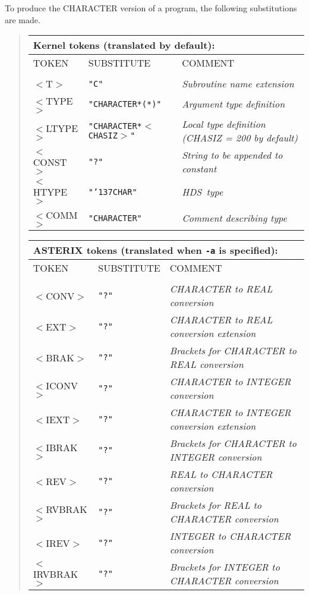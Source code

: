 \documentclass[twoside,11pt]{article}
\renewcommand{\_}{{\tt\char'137}}     %
\newcommand{\HDS}{{\footnotesize HDS}\normalsize}
\begin{document}
To produce the CHARACTER version of a program, the following
substitutions are made.
\begin{quote}
\begin{tabular}{lll}
\multicolumn{3}{l}{\bf{Kernel} tokens (translated by default):} \\
\hline
TOKEN      &SUBSTITUTE     & COMMENT \\
\\
$<$T$>$     &{\tt "C"}             &{\em Subroutine name extension} \\
$<$TYPE$>$  &{\tt "CHARACTER*(*)"} &{\em Argument type definition} \\
$<$LTYPE$>$ &{\tt "CHARACTER*$<$CHASIZ$>$"} &{\em Local type definition (CHASIZ = 200 by default)} \\
$<$CONST$>$ &{\tt "?"}            &{\em String to be appended to constant} \\
$<$HTYPE$>$ &{\tt "\_CHAR"}       &{\em \HDS\ type} \\
$<$COMM$>$  &{\tt "CHARACTER"}    &{\em Comment describing type} \\
\end{tabular}

\begin{tabular}{lll}
\multicolumn{3}{l}{\bf{ASTERIX} tokens (translated when {\tt -a} is specified):} \\
\hline
TOKEN      &SUBSTITUTE     & COMMENT \\
\\
$<$CONV$>$  &{\tt "?"} &{\em CHARACTER to REAL conversion}\\
$<$EXT$>$   &{\tt "?"} &{\em CHARACTER to REAL conversion extension}\\
$<$BRAK$>$  &{\tt "?"} &{\em Brackets for CHARACTER to REAL conversion}\\
$<$ICONV$>$ &{\tt "?"} &{\em CHARACTER to INTEGER conversion}\\
$<$IEXT$>$  &{\tt "?"} &{\em CHARACTER to INTEGER conversion extension}\\
$<$IBRAK$>$ &{\tt "?"} &{\em Brackets for CHARACTER to INTEGER conversion} \\
$<$REV$>$   &{\tt "?"} &{\em REAL to CHARACTER conversion} \\
$<$RVBRAK$>$ &{\tt "?"} &{\em Brackets for REAL to CHARACTER conversion}\\
$<$IREV$>$  &{\tt "?"} &{\em INTEGER to CHARACTER conversion}\\
$<$IRVBRAK$>$ &{\tt "?"} &{\em Brackets for INTEGER to CHARACTER conversion} \\
\end{tabular}
\end{quote}
\end{document}
